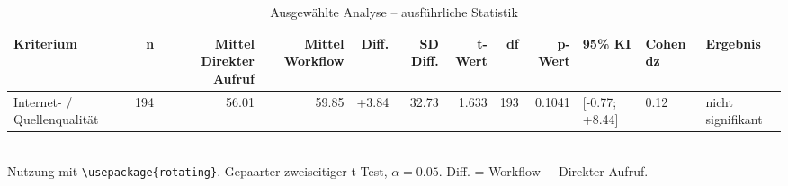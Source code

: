 \begin{table}
\centering
\caption{Ausgewählte Analyse -- ausführliche Statistik}
\begin{tabular}{lrrrrrrrrlll}
\toprule
Kriterium & n & Mittel Direkter Aufruf & Mittel Workflow & Diff. & SD Diff. & t-Wert & df & p-Wert & 95\% KI & Cohen dz & Ergebnis \\
\midrule
Internet- / Quellenqualität & 194 & 56.01 & 59.85 & +3.84 & 32.73 & 1.633 & 193 & 0.1041 & [-0.77; +8.44] & 0.12 & nicht signifikant \\
\bottomrule
\end{tabular}
\\[2mm]
\footnotesize Nutzung mit \texttt{\textbackslash usepackage\{rotating\}}. Gepaarter zweiseitiger t-Test, $\alpha=0.05$. Diff. = Workflow $-$ Direkter Aufruf.
\end{table}

